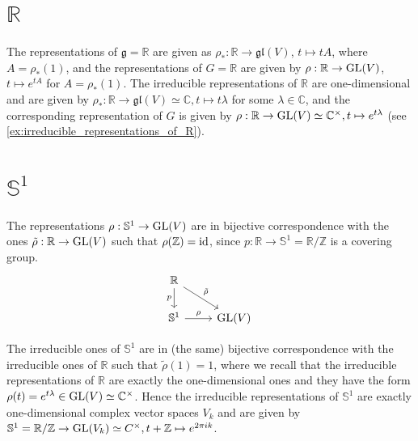 \documentclass{report}
\begin{document}
\section{$\mathbb R$}
The representations of $\mathfrak g = \mathbb R$ are given as $\rho_*: \mathbb R \to \mathfrak{gl}(V)$, $t \mapsto t A$, where $A = \rho_*(1)$, and the representations of $G = \mathbb R$ are given by $\rho: \mathbb R \to \operatorname{{\mathrm{GL}}}(V)$, $t \mapsto e^{tA}$ for $A = \rho_*(1)$.
The irreducible representations of $\mathbb R$ are one-dimensional and are given by $\rho_*: \mathbb R \to \mathfrak{gl}(V) \simeq \mathbb C, t \mapsto t \lambda$ for some $\lambda \in \mathbb C$, and the corresponding representation of $G$ is given by $\rho: \mathbb R \to \operatorname{{\mathrm{GL}}}(V) \simeq \mathbb C^{\times}, t \mapsto e^{t \lambda}$ (see \cref{ex:irreducible_representations_of_R}).
\section{$\mathbb S^1$}
The representations $\rho:\mathbb S^1 \to \operatorname{{\mathrm{GL}}}(V)$ are in bijective correspondence with the ones $\tilde \rho: \mathbb R \to \operatorname{{\mathrm{GL}}}(V)$ such that $\rho(\mathbb Z) = \operatorname{id}$, since $p: \mathbb R \to \mathbb S^1 = \mathbb R / \mathbb Z$ is a covering group.
\[
    \begin{tikzcd}
        \mathbb R \arrow[dr, "\tilde \rho"] \arrow[d, "p"']  \\
        \mathbb S^1 \arrow[r, "\rho"] & \GL(V)
    \end{tikzcd}
\]

The irreducible ones of $\mathbb S^1$ are in (the same) bijective correspondence with the irreducible ones of $\mathbb R$ such that $\tilde \rho(1) = 1$, where we recall that the irreducible representations of $\mathbb R$ are exactly the one-dimensional ones and they have the form $\rho(t) = e^{t \lambda} \in \operatorname{{\mathrm{GL}}}(V) \simeq \mathbb C^{\times}$.
Hence the irreducible representations of $\mathbb S^1$ are exactly one-dimensional complex vector spaces $V_k$ and are given by $\mathbb S^1 = \mathbb R/ \mathbb Z \to \operatorname{{\mathrm{GL}}}(V_k) \simeq C^{\times}, t + \mathbb Z \mapsto e^{2 \pi i k }$.
\end{document}
